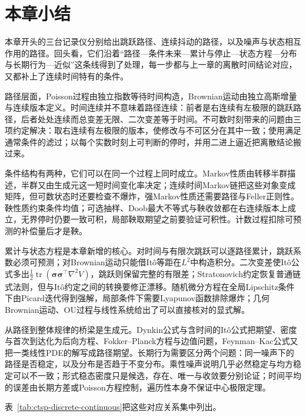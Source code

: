 \section{本章小结}
\label{sec:ctsp-summary}

本章开头的三台记录仪分别给出跳跃路径、连续抖动的路径，以及噪声与状态相互作用的路径。回头看，它们沿着“路径—条件未来—累计与停止—状态方程—分布与长期行为—近似”这条线得到了处理，每一步都与上一章的离散时间结论对应，又都补上了连续时间特有的条件。

路径层面，Poisson过程由独立指数等待时间构造，Brownian运动由独立高斯增量与连续版本定义。时间连续并不意味着路径连续：前者是右连续有左极限的跳跃路径，后者处处连续而总变差无限、二次变差等于时间。不可数时刻带来的问题由三项约定解决：取右连续有左极限的版本，使修改与不可区分在其中一致；使用满足通常条件的滤过；以每个实数时刻上可判断的停时，并用二进上逼近把离散结论搬过来。

条件结构有两种，它们可以在同一个过程上同时成立。Markov性质由转移半群描述，半群又由生成元这一短时间变化率决定；连续时间Markov链把这些对象变成矩阵，但可数状态时还要检查不爆炸，强Markov性质还需要路径与Feller正则性。鞅性质约束条件均值；可选抽样、Doob最大不等式与鞅收敛都在右连续版本上成立，无界停时仍要一致可积，局部鞅取期望之前要验证可积性。计数过程扣除可预测的补偿量后才是鞅。

累计与状态方程是本章新增的核心。对时间与有限次跳跃可以逐路径累计，跳跃系数必须可预测；对Brownian运动只能借Itô等距在$L^2$中构造积分。二次变差使Itô公式多出$\frac12\operatorname{tr}(\bm\sigma\bm\sigma^\top\nabla^2V)$，跳跃则保留完整的有限差；Stratonovich约定恢复普通链式法则，但与Itô约定之间的转换要修正漂移。随机微分方程在全局Lipschitz条件下由Picard迭代得到强解，局部条件下需要Lyapunov函数排除爆炸；几何Brownian运动、OU过程与线性系统给出了可以直接核对的显式解。

从路径到整体规律的桥梁是生成元。Dynkin公式与含时间的Itô公式把期望、密度与首次到达化为后向方程、Fokker--Planck方程与边值问题，Feynman--Kac公式又把一类线性PDE的解写成路径期望。长期行为需要区分两个问题：同一噪声下的路径是否稳定，以及分布是否趋于不变分布。乘性噪声说明几乎必然稳定与均方稳定可以不一致；形式稳态密度只是候选，存在、唯一与收敛要分别论证；时间平均的误差由长期方差或Poisson方程控制，遍历性本身不保证中心极限定理。

表~\ref{tab:ctsp-discrete-continuous}把这些对应关系集中列出。

